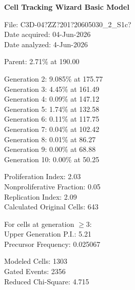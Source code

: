 \documentclass[UTF8,10pt,a4paper,fontset=fandol]{ctexart}
\begin{document}
\noindent
\begin{minipage}[t]{0.48\linewidth}
\centering
{}
\end{minipage}
\hfill
\begin{minipage}[t]{0.46\linewidth}
\small
\textbf{Cell Tracking Wizard Basic Model}

File: C3D-04?ZZ?201?20605030\_2\_S1c?\\
Date acquired: 04-Jun-2026\\
Date analyzed: 4-Jun-2026

\medskip
Parent: 2.71\% at 190.00

Generation 2: 9.085\% at 175.77\\
Generation 3: 4.45\% at 161.49\\
Generation 4: 0.09\% at 147.12\\
Generation 5: 1.74\% at 132.58\\
Generation 6: 0.11\% at 117.75\\
Generation 7: 0.04\% at 102.42\\
Generation 8: 0.01\% at 86.27\\
Generation 9: 0.00\% at 68.88\\
Generation 10: 0.00\% at 50.25

\medskip
Proliferation Index: 2.03\\
Nonproliferative Fraction: 0.05\\
Replication Index: 2.09\\
Calculated Original Cells: 643

\medskip
For cells at generation $\geq 3$:\\
Upper Generation P.I.: 5.21\\
Precursor Frequency: 0.025067

\medskip
Modeled Cells: 1303\\
Gated Events: 2356\\
Reduced Chi-Square: 4.715
\end{minipage}

\bigskip
\end{document}

